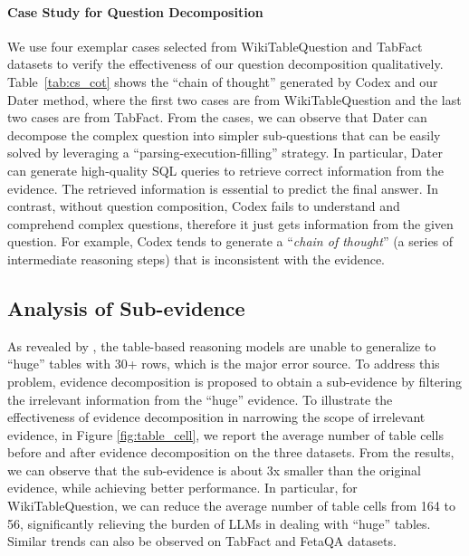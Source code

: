 \paragraph{Case Study for Question Decomposition}
We use four exemplar cases selected from WikiTableQuestion and TabFact datasets to verify the effectiveness of our question decomposition qualitatively.
Table~\ref{tab:cs_cot} shows the ``chain of thought'' generated by Codex and our Dater method, where the first two cases are from WikiTableQuestion and the last two cases are from TabFact. From the cases, we can observe that Dater can decompose the complex question into simpler sub-questions that can be easily solved by leveraging a ``parsing-execution-filling'' strategy. In particular, Dater can generate high-quality SQL queries to retrieve correct information from the evidence. The retrieved information is essential to predict the final answer.  In contrast, without question composition, Codex fails to understand and comprehend complex questions, therefore it just gets information from the given question. For example, Codex tends to generate a ``\textit{chain of thought}'' (a series of intermediate reasoning steps) that is inconsistent with the evidence. 

\subsection{Analysis of Sub-evidence}
As revealed by \citep{llmtab}, the table-based reasoning models are unable to generalize to ``huge'' tables with 30+ rows, which is the major error source. To address this problem, evidence decomposition is proposed to obtain a sub-evidence by filtering the irrelevant information from the ``huge'' evidence. To illustrate the effectiveness of evidence decomposition in narrowing the scope of irrelevant evidence, in Figure \ref{fig:table_cell}, we report the average number of table cells before and after evidence decomposition on the three datasets. From the results, we can observe that the sub-evidence is about 3x smaller than the original evidence, while achieving better performance. In particular, for WikiTableQuestion, we can reduce the average number of table cells from 164 to 56, significantly relieving the burden of LLMs in dealing with ``huge'' tables. Similar trends can also be observed on TabFact and FetaQA datasets. 

